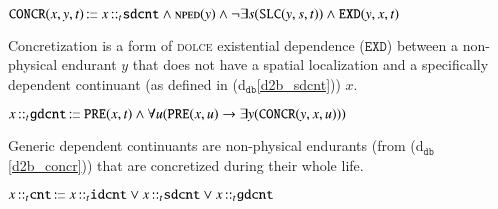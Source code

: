 \documentclass[ao]{iosart2x}
\newcommand{\dbDefLabel}{\textrm{d$_\texttt{db}$}}
\newcounter{cntdbdf}
\newcommand{\dbdf}[1]{\refstepcounter{cntdbdf}\begin{small}{\bf \dbDefLabel\thecntdbdf\label{#1}}\end{small}}
\newcommand{\refdbdf}[1]{({\dbDefLabel}\ref{#1})}
\newcommand{\pr}[1]{\mathtt{#1}}
\newcommand{\cn}[1]{\mathtt{#1}}
\newcommand\textequal{%
 \rule[.08ex]{5pt}{0.35pt}\llap{\rule[.78ex]{5pt}{0.35pt}}}
\newcommand{\sdef}{{\hspace{1.5pt}:\hspace{-2.5pt}\textequal\hspace{3pt}}}
\newcommand{\dolce}{{\textsc{dolce}}}
\newcommand {\NPEDdcat} {\textsc{nped}}
\newcommand {\Sdcat} {\textsc{s}}
\newcommand {\PREd} {\ensuremath{\pr{PRE}}}
\newcommand {\DQTd} {\ensuremath{\pr{DQT}}}
\newcommand {\EXDd} {\ensuremath{\pr{EXD}}}
\newcommand {\SLCd} {\ensuremath{\pr{SLC}}}
\newcommand{\cntbcat}{\cn{cnt}}
\newcommand{\idcntbcat}{\cn{idcnt}}
\newcommand{\gdcntbcat}{\cn{gdcnt}}
\newcommand{\sdcntbcat}{\cn{sdcnt}}
\newcommand{\sregbcat}{\cn{sreg}}
\newcommand{\bfoiof}[1]{{\,::_{#1\:\!}}}
\newcommand{\bfoconcr}{\pr{CONCR}}
\begin{document}
\item[\dbdf{d2b_concr}] $\bfoconcr(x,y,t) \sdef x \bfoiof{t} \sdcntbcat \land \NPEDdcat(y) \land \neg\exists s(\SLCd(y,s,t))  \land \EXDd(y,x,t)$

\vspace{1pt}
Concretization is a form of {\dolce} existential dependence ($\EXDd$) between a non-physical endurant $y$ that does not have a spatial localization and a specifically dependent continuant (as defined in \refdbdf{d2b_sdcnt}) $x$.

%

\item[\dbdf{d2b_gdcnt}] $x \bfoiof{t} \gdcntbcat \sdef \PREd(x,t) \land \forall u(\PREd(x,u) \to \exists y(\bfoconcr(y,x,u)))$

\vspace{1pt}
Generic dependent continuants are non-physical endurants (from \refdbdf{d2b_concr}) that are concretized during their whole life.

%
%
%
%
%

\item[\dbdf{d2b_cnt}] $x \bfoiof{t} \cntbcat \sdef x \bfoiof{t} \idcntbcat \lor x \bfoiof{t} \sdcntbcat \lor x \bfoiof{t} \gdcntbcat$

%
\end{document}
